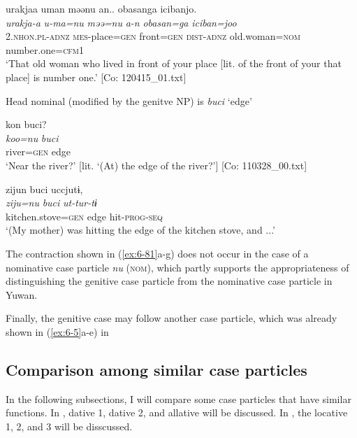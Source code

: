 \ex
{\TM}
\glll urakjaa  uman  məənu  an..   {\textbar}obasan{\textbar}ga  {\textbar}iciban{\textbar}jo.\\
\textit{urakja-a}  \textit{u-ma=nu}  \textit{məə=nu}  \textit{a-n}   \textit{obasan=ga}  \textit{iciban=joo}\\
2.\textsc{nhon}.\textsc{pl}-\textsc{adnz}  \textsc{mes}-place=\textsc{gen}  front=\textsc{gen}  \textsc{dist}-\textsc{adnz}  old.woman=\textsc{nom}  number.one=\textsc{cfm}1\\
\glt ‘That old woman who lived in front of your place [lit. of the front of your that place] is number one.’ [Co: 120415\_01.txt]

  Head nominal (modified by the genitve NP) is \textit{buci} ‘edge’

\ex
{\TM}
\glll kon  buci?\\
\textit{koo=nu}  \textit{buci}\\
      river=\textsc{gen}  edge\\
\glt ‘Near the river?’ [lit. ‘(At) the edge of the river?’]      [Co: 110328\_00.txt]

\glll zijun  buci  uccjutɨ,\\
      \textit{ziju=nu}  \textit{buci}  \textit{ut-tur-tɨ}\\
      kitchen.stove=\textsc{gen}  edge  hit-\textsc{prog}-\textsc{seq}\\
\glt ‘(My mother) was hitting the edge of the kitchen stove, and ...’
\z
\z

The contraction shown in (\ref{ex:6-81}a-g) does not occur in the case of a nominative case particle \textit{nu} (\textsc{nom}), which partly supports the appropriateness of distinguishing the genitive case particle from the nominative case particle in Yuwan.

  Finally, the genitive case may follow another case particle, which was already shown in (\ref{ex:6-5}a-e) in 

\subsection{Comparison among similar case particles}

In the following subsections, I will compare some case particles that have similar functions. In , dative 1, dative 2, and allative will be discussed. In , the locative 1, 2, and 3 will be disscussed.

